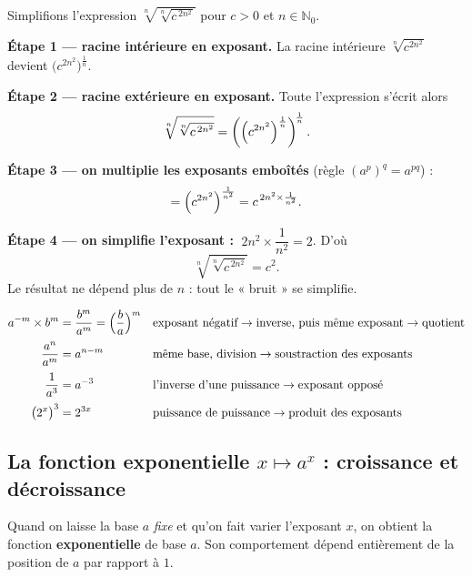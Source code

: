 \documentclass[11pt,a4paper]{article}
\newcommand{\N}{\mathbb{N}}
\begin{document}
\begin{exemple}
Simplifions l'expression $\displaystyle \sqrt[n]{\sqrt[n]{c^{\,2n^{2}}}}$ pour $c>0$ et $n\in\N_0$.

\medskip
\textbf{Étape 1 — racine intérieure en exposant.} La racine intérieure $\sqrt[n]{c^{2n^2}}$ devient
$\bigl(c^{2n^2}\bigr)^{\frac{1}{n}}$.

\textbf{Étape 2 — racine extérieure en exposant.} Toute l'expression s'écrit alors
\[ \sqrt[n]{\sqrt[n]{c^{\,2n^{2}}}}
   =\left(\Bigl(c^{2n^{2}}\Bigr)^{\frac{1}{n}}\right)^{\!\frac{1}{n}}. \]

\textbf{Étape 3 — on multiplie les exposants emboîtés} (règle $(a^p)^q=a^{pq}$) :
\[ =\Bigl(c^{2n^{2}}\Bigr)^{\frac{1}{n^{2}}}
   = c^{\,2n^{2}\times\frac{1}{n^{2}}}. \]

\textbf{Étape 4 — on simplifie l'exposant :} $\;2n^{2}\times\dfrac{1}{n^{2}}=2$. D'où
\[ \boxed{\;\sqrt[n]{\sqrt[n]{c^{\,2n^{2}}}}=c^{2}.\;} \]
Le résultat ne dépend plus de $n$ : tout le « bruit » se simplifie.
\end{exemple}

\begin{exemple}
\begin{align*}
  a^{-m}\times b^{m} &= \frac{b^{m}}{a^{m}} = \Bigl(\frac{b}{a}\Bigr)^{m}
     &&\text{exposant négatif} \to \text{inverse, puis même exposant} \to \text{quotient} \\[2pt]
  \frac{a^{n}}{a^{m}} &= a^{n-m}
     &&\text{même base, division} \to \text{soustraction des exposants} \\[2pt]
  \frac{1}{a^{3}} &= a^{-3}
     &&\text{l'inverse d'une puissance} \to \text{exposant opposé} \\[2pt]
  \bigl(2^{x}\bigr)^{3} &= 2^{3x}
     &&\text{puissance de puissance} \to \text{produit des exposants}
\end{align*}
\end{exemple}

\subsection{La fonction exponentielle $x\mapsto a^{x}$ : croissance et décroissance}

Quand on laisse la base $a$ \emph{fixe} et qu'on fait varier l'exposant $x$, on obtient la fonction
\textbf{exponentielle} de base $a$. Son comportement dépend entièrement de la position de $a$ par
rapport à $1$.
\end{document}
